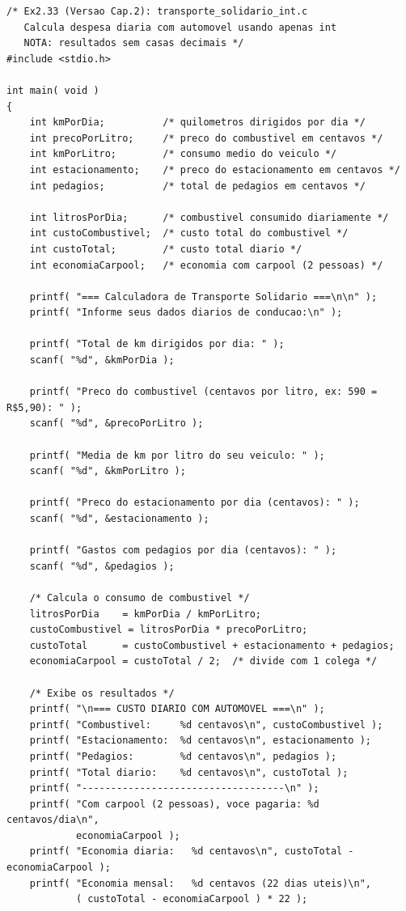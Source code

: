 \documentclass[12pt,a4paper]{article}
\begin{document}
\begin{respostabox}
\begin{lstlisting}
/* Ex2.33 (Versao Cap.2): transporte_solidario_int.c
   Calcula despesa diaria com automovel usando apenas int
   NOTA: resultados sem casas decimais */
#include <stdio.h>

int main( void )
{
    int kmPorDia;          /* quilometros dirigidos por dia */
    int precoPorLitro;     /* preco do combustivel em centavos */
    int kmPorLitro;        /* consumo medio do veiculo */
    int estacionamento;    /* preco do estacionamento em centavos */
    int pedagios;          /* total de pedagios em centavos */

    int litrosPorDia;      /* combustivel consumido diariamente */
    int custoCombustivel;  /* custo total do combustivel */
    int custoTotal;        /* custo total diario */
    int economiaCarpool;   /* economia com carpool (2 pessoas) */

    printf( "=== Calculadora de Transporte Solidario ===\n\n" );
    printf( "Informe seus dados diarios de conducao:\n" );

    printf( "Total de km dirigidos por dia: " );
    scanf( "%d", &kmPorDia );

    printf( "Preco do combustivel (centavos por litro, ex: 590 = R$5,90): " );
    scanf( "%d", &precoPorLitro );

    printf( "Media de km por litro do seu veiculo: " );
    scanf( "%d", &kmPorLitro );

    printf( "Preco do estacionamento por dia (centavos): " );
    scanf( "%d", &estacionamento );

    printf( "Gastos com pedagios por dia (centavos): " );
    scanf( "%d", &pedagios );

    /* Calcula o consumo de combustivel */
    litrosPorDia    = kmPorDia / kmPorLitro;
    custoCombustivel = litrosPorDia * precoPorLitro;
    custoTotal      = custoCombustivel + estacionamento + pedagios;
    economiaCarpool = custoTotal / 2;  /* divide com 1 colega */

    /* Exibe os resultados */
    printf( "\n=== CUSTO DIARIO COM AUTOMOVEL ===\n" );
    printf( "Combustivel:     %d centavos\n", custoCombustivel );
    printf( "Estacionamento:  %d centavos\n", estacionamento );
    printf( "Pedagios:        %d centavos\n", pedagios );
    printf( "Total diario:    %d centavos\n", custoTotal );
    printf( "-----------------------------------\n" );
    printf( "Com carpool (2 pessoas), voce pagaria: %d centavos/dia\n",
            economiaCarpool );
    printf( "Economia diaria:   %d centavos\n", custoTotal - economiaCarpool );
    printf( "Economia mensal:   %d centavos (22 dias uteis)\n",
            ( custoTotal - economiaCarpool ) * 22 );


\end{lstlisting}
\end{respostabox}
\end{document}
